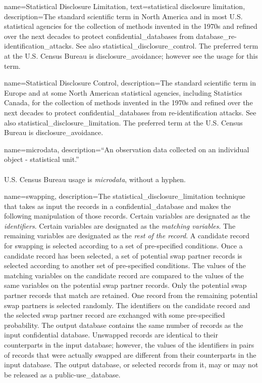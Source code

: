 {
    name=Statistical Disclosure Limitation,
    text=statistical disclosure limitation,
    description={The standard scientific term in North America and in most U.S. statistical agencies for the collection of methods invented in the 1970s and refined over the next decades to protect \glspl{confidential_database} from \glspl{database_re-identification_attack}. See also \gls{statistical_disclosure_control}. The preferred term at the U.S. Census Bureau is \gls{disclosure_avoidance}; however see the usage for this term.}
}

{
    name=Statistical Disclosure Control,
    description={The standard scientific term in Europe and at some North American statistical agencies, including Statistics Canada, for the collection of methods invented in the 1970s and refined over the next decades to protect \glspl{confidential_database} from re-identification attacks. See also \gls{statistical_disclosure_limitation}. The preferred term at the U.S. Census Bureau is \gls{disclosure_avoidance}.}
}

{
    name=microdata,
    description={``An observation data collected on an individual
    object - statistical unit.'' \parencite{oecd_oecd_nodate}\\
    \\
    U.S. Census Bureau usage is \textit{microdata}, without a hyphen.}
}

{
    name=swapping,
    description={The \gls{statistical_disclosure_limitation} technique that takes as input the \glspl{record} in a \gls{confidential_database} and makes the following manipulation of those records. Certain variables are designated as the \textit{identifiers}. Certain variables are designated as the \textit{matching variables}. The remaining variables are designated as the \textit{rest of the record}. A candidate record for swapping is selected according to a set of pre-specified conditions. Once a candidate record has been selected, a set of potential swap partner records is selected according to another set of pre-specified conditions. The values of the matching variables on the candidate record are compared to the values of the same variables on the potential swap partner records. Only the potential swap partner records that match are retained. One record from the remaining potential swap partners is selected randomly. The identifiers on the candidate record and the selected swap partner record are exchanged with some pre-specified probability. The output database contains the same number of records as the input confidential database. Unswapped records are identical to their counterparts in the input database; however, the values of the identifiers in pairs of records that were actually swapped are different from their counterparts in the input database. The output database, or selected records from it, may or may not be released as a \gls{public-use_database}.}
}

